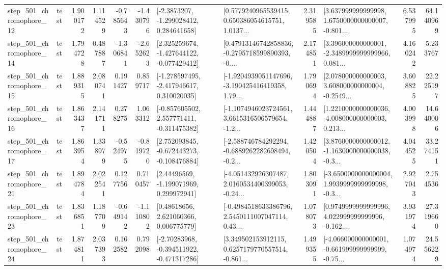 \begin{tabular}{llrrrrllrlrr}
  step\_501\_chromophore\_12 &      test &      1.900172 &    1.114529 &     -0.785643 & -1.430796 &     [-2.3873207, -1.299028412, 0.284641658] &  [0.5779240965539415, 0.650386054615751, 1.0137... &       2.319585 &  [3.637999999999998, 1.6750000000000007, -0.801... &            6.537995 &         64.140969 \\
  step\_501\_chromophore\_14 &      test &      1.794728 &    0.487887 &     -1.306841 & -2.652623 &   [2.325259674, -1.427644122, -0.077429412] &  [0.47913146742858836, -0.2795718599890393, -0.... &       2.174851 &  [3.396000000000001, -2.3489999999999966, 0.081... &            4.160242 &          5.233767 \\
  step\_501\_chromophore\_15 &      test &      1.889315 &    2.080741 &      0.191427 &  0.859717 &   [-1.278597495, -2.417946617, 0.310020035] &  [-1.9204939051147696, -3.190425416419358, 1.79... &       1.790694 &  [2.078000000000003, 3.608000000000004, -0.2549... &            3.608825 &         22.225197 \\
  step\_501\_chromophore\_16 &      test &      1.863437 &    2.141711 &      0.278275 &  1.063312 &   [-0.857605502, 2.557771411, -0.311475382] &  [-1.1074946023724561, 3.6615316506579654, -1.2... &       1.444887 &  [1.2210000000000036, -4.008000000000003, 0.213... &            4.003998 &         14.640006 \\
  step\_501\_chromophore\_17 &      test &      1.863954 &    1.338979 &     -0.524975 & -0.819720 &   [2.752093845, -0.672443273, -0.108476884] &  [-2.588746784292294, -0.6889262282698494, -0.2... &       1.420504 &  [3.8760000000000012, -1.1630000000000038, -0.3... &            4.044525 &         33.274151 \\
  step\_501\_chromophore\_21 &      test &      1.894784 &    2.022541 &      0.127756 &  0.710457 &     [2.44496569, -1.199071969, 0.299972941] &  [-4.051432926307487, 2.0160534400399053, -0.24... &       1.803091 &  [-3.6500000000000004, 1.9939999999999998, -0.3... &            2.927043 &          2.754536 \\
  step\_501\_chromophore\_23 &      test &      1.836851 &    1.187709 &     -0.649142 & -1.110802 &      [0.48618656, 2.621060366, 0.006775779] &  [-0.4984518633386796, 2.5450111007047114, 0.43... &       1.078073 &  [0.9749999999999996, 4.022999999999996, -0.162... &            3.931974 &         27.319660 \\
  step\_501\_chromophore\_24 &      test &      1.874811 &    2.037393 &      0.162582 &  0.792098 &   [-2.70283968, -0.394511922, -0.471317286] &  [3.349502153912115, 0.6257179770557514, -0.861... &       1.499355 &  [-4.066000000000001, -0.661999999999999, -0.75... &            1.074974 &         24.556229 \\

\end{tabular}
